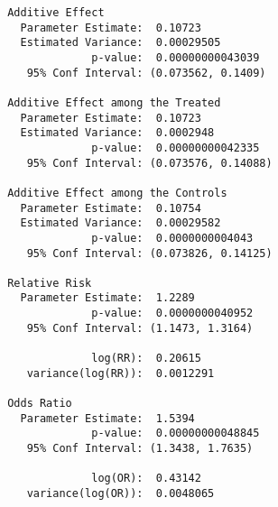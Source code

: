     
    \begin{verbatim}
 Additive Effect
   Parameter Estimate:  0.10723
   Estimated Variance:  0.00029505
              p-value:  0.00000000043039
    95% Conf Interval: (0.073562, 0.1409) 

 Additive Effect among the Treated
   Parameter Estimate:  0.10723
   Estimated Variance:  0.0002948
              p-value:  0.00000000042335
    95% Conf Interval: (0.073576, 0.14088) 

 Additive Effect among the Controls
   Parameter Estimate:  0.10754
   Estimated Variance:  0.00029582
              p-value:  0.0000000004043
    95% Conf Interval: (0.073826, 0.14125) 

 Relative Risk
   Parameter Estimate:  1.2289
              p-value:  0.0000000040952
    95% Conf Interval: (1.1473, 1.3164) 

              log(RR):  0.20615
    variance(log(RR)):  0.0012291 

 Odds Ratio
   Parameter Estimate:  1.5394
              p-value:  0.00000000048845
    95% Conf Interval: (1.3438, 1.7635) 

              log(OR):  0.43142
    variance(log(OR)):  0.0048065 
    \end{verbatim}

 
